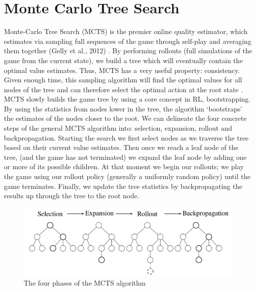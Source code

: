 \documentclass[msc, deptreport, ai, romanprepages]{infthesis}
\begin{document}
\section{Monte Carlo Tree Search}
Monte-Carlo Tree Search (MCTS) is the premier online quality estimator, which estimates via sampling full sequences of the game through self-play and averaging them together (Gelly et al., 2012) \cite{Gelly}. By performing rollouts (full simulations of the game from the current state), we build a tree which will eventually contain the optimal value estimates. Thus, MCTS has a very useful property: consistency. Given enough time, this sampling algorithm will find the optimal values for all nodes of the tree and can therefore select the optimal action at the root state \cite{Gelly}. MCTS slowly builds the game tree by using a core concept in RL, bootstrapping. By using the statistics from nodes lower in the tree, the algorithm ‘bootstraps’ the estimates of the nodes closer to the root. We can delineate the four concrete steps of the general MCTS algorithm into: selection, expansion, rollout and backpropagation. Starting the search we first select nodes as we traverse the tree based on their current value estimates. Then once we reach a leaf node of the tree, (and the game has not terminated) we expand the leaf node by adding one or more of its possible children. At that moment we begin our rollouts; we play the game using our rollout policy (generally a uniformly random policy) until the game terminates. Finally, we update the tree statistics by backpropagating the results up through the tree to the root node. 

\begin{figure}[h]
\caption{The four phases of the MCTS algorithm}
\centering
\includegraphics[scale=.825]{figures/MCTS}
\end{figure}
\end{document}
